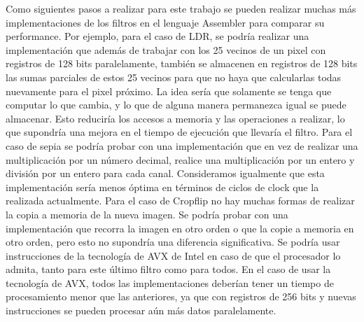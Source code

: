 \documentclass[a4paper]{article}
\newenvironment{codesnippet}{%
	\begin{Sbox}\begin{minipage}{\textwidth}\sffamily\small}%
	{\end{minipage}\end{Sbox}%
		\begin{center}%
		\vspace{-0.4cm}\colorbox{litegrey}{\TheSbox}\end{center}\vspace{0.3cm}}
\begin{document}
\par
Como siguientes pasos a realizar para este trabajo se pueden realizar
muchas más implementaciones de los filtros en el lenguaje Assembler para comparar
su performance. Por ejemplo, para el caso de LDR, se podría realizar una implementación
que además de trabajar con los 25 vecinos de un pixel con registros de 128 bits paralelamente,
también se almacenen en registros de 128 bits las sumas parciales de estos 25 vecinos para que
no haya que calcularlas todas nuevamente para el pixel próximo. La idea sería que solamente se
tenga que computar lo que cambia, y lo que de alguna manera permanezca igual se puede almacenar.
Esto reduciría los accesos a memoria y las operaciones a realizar, lo que supondría una mejora en
el tiempo de ejecución que llevaría el filtro. Para el caso de sepia se podría probar con una
implementación que en vez de realizar una multiplicación por un número decimal, realice una multiplicación
por un entero y división por un entero para cada canal. Consideramos igualmente que esta implementación
sería menos óptima en términos de ciclos de clock que la realizada actualmente. Para el caso de
Cropflip no hay muchas formas de realizar la copia a memoria de la nueva imagen. Se podría probar
con una implementación que recorra la imagen en otro orden o que la copie a memoria en otro orden,
pero esto no supondría una diferencia significativa. Se podría usar instrucciones de la tecnología
de AVX de Intel en caso de que el procesador lo admita, tanto para este último filtro como para todos.
En el caso de usar la tecnología de AVX, todos las implementaciones deberían tener un tiempo de
procesamiento menor que las anteriores, ya que con registros de 256 bits y nuevas instrucciones se pueden
procesar aún más datos paralelamente.






\end{document}
